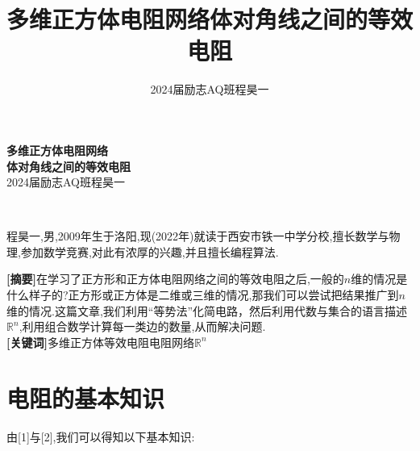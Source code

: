 \documentclass[10.5pt]{article}
\title{\textbf{\Large 多维正方体电阻网络体对角线之间的等效电阻}}
\author{2024届励志AQ班\quad 程昊一}
\date{}
\begin{document}
\vspace*{\fill}
\begin{center}
	\textbf{\huge 多维正方体电阻网络\\[0.5em]体对角线之间的等效电阻}\\[2em]
	{\large 2024届励志AQ班\quad 程昊一}
\end{center}
\vspace{\fill+10cm}
\newpage
{}\\[-0.3cm]
\par 程昊一,男,2009年生于洛阳,现(2022年)就读于西安市铁一中学分校,擅长数学与物理,参加数学竞赛,对此有浓厚的兴趣,并且擅长编程算法.
\newpage
\maketitle
\hspace*{-2em}\textbf{[摘要]}\quad 在学习了正方形和正方体电阻网络之间的等效电阻之后,一般的$n$维的情况是什么样子的?正方形或正方体是二维或三维的情况,那我们可以尝试把结果推广到$n$维的情况.这篇文章,我们利用“等势法”化简电路，然后利用代数与集合的语言描述$\mathbb{R}^n$,利用组合数学计算每一类边的数量,从而解决问题.\\
\textbf{[关键词]}\quad 多维正方体\quad 等效电阻\quad 电阻网络\quad $\mathbb{R}^n$
\section{电阻的基本知识}
由[1]与[2],我们可以得知以下基本知识:
\end{document}
